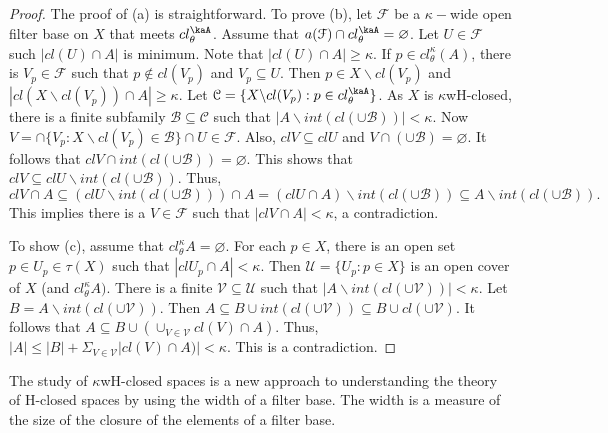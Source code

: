 \documentclass[11pt]{amsart}
\theoremstyle{definition}
\theoremstyle{remark}
\numberwithin{equation}{section}
\begin{document}
\begin{proof} 
The proof of (a) is straightforward. To prove (b), let ${\ensuremath{\mathcal{{F}}}}$ be a $\kappa-$wide open filter base on $X$ that meets $cl_{\theta }^\kaA$. Assume that $a({\ensuremath{\mathcal{{F}}}}) \cap cl_{\theta }^\kaA = \varnothing$. 
Let $U \in {\ensuremath{\mathcal{{F}}}}$ such $|cl(U)\cap A|$ is minimum.  Note that  $|cl(U)\cap A| \geq \kappa$.
 If $p \in cl_{\theta }^{\kappa}(A) $, there is $V_p \in {\ensuremath{\mathcal{{F}}}}$ such that $p \not\in cl(V_p)$ and $V_p \subseteq U$.  Then $p \in X\backslash cl(V_p)$ and $|cl(X\backslash cl(V_p)) \cap A| \geq \kappa$. Let ${\ensuremath{\mathcal{{C}}}}=\{X\backslash cl(V_p): p \in cl_{\theta }^\kaA\}$.  
 As $X$ is $\kappa$wH-closed, there is a finite subfamily ${\ensuremath{\mathcal{{B}}}}\subseteq{\ensuremath{\mathcal{{C}}}}$ such that $|A\backslash int(cl(\cup{\ensuremath{\mathcal{{B}}}}))| < \kappa$.  
 Now $V = \cap\{V_p: X\backslash cl(V_p) \in {\ensuremath{\mathcal{{B}}}}\} \cap U \in {\ensuremath{\mathcal{{F}}}}$.  Also, $clV \subseteq clU$ and $V \cap (\cup {\ensuremath{\mathcal{{B}}}}) = \varnothing$. It follows that $clV \cap int(cl(\cup{\ensuremath{\mathcal{{B}}}})) = \varnothing$.  
 This shows that $clV \subseteq clU \backslash int(cl(\cup{\ensuremath{\mathcal{{B}}}}))$.  Thus,  $clV \cap A \subseteq (clU \backslash int(cl(\cup{\ensuremath{\mathcal{{B}}}}))) \cap A = (clU \cap A)\backslash int(cl(\cup{\ensuremath{\mathcal{{B}}}}))  \subseteq  A\backslash int(cl(\cup{\ensuremath{\mathcal{{B}}}})).$ This implies there is a  $V \in{\ensuremath{\mathcal{{F}}}}$ such that $|clV\cap A| < \kappa$, a contradiction. 
 
To show (c), assume that $cl^{\kappa}_{\theta}A = \varnothing.$  For each $ p \in X$, there is an open set $p \in U_p \in \tau(X)$ such that $|clU_p \cap A| < \kappa$.  Then $\mathcal U = \{U_p:p \in X\}$ is an open cover of $X$ (and $cl^{\kappa}_{\theta}A).$  There is a finite $\mathcal V \subseteq \mathcal U$ such that $|A\backslash int(cl(\cup \mathcal V))| < \kappa$.  Let $B = A\backslash int(cl(\cup \mathcal V))$.  Then $A \subseteq   B \cup int(cl(\cup \mathcal V)) \subseteq B \cup cl(\cup \mathcal V)$.  It follows that $A  \subseteq B \cup (\cup_{V \in \mathcal V} cl(V) \cap A)$.  Thus, $|A| \leq |B| + \Sigma_{V \in \mathcal V}|cl(V) \cap A)| < \kappa$.  This is a contradiction. 
 \end{proof}

The study of $\kappa$wH-closed spaces  is a new approach to understanding the theory of  H-closed spaces by using  the width of a filter base.  The width  is a measure of the size of the closure of the elements of a filter base.  
 
\end{document}

